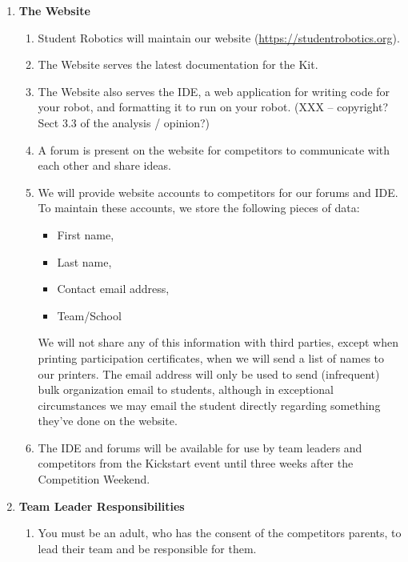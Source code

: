 \documentclass[a4paper, 11pt]{scrartcl}
\begin{document}
\begin{enumerate}
\begin{enumerate}
\begin{enumerate}
\end{enumerate}
\end{enumerate}

\item \textbf{The Website}
\begin{enumerate}

\item Student Robotics will maintain our website (\url{https://studentrobotics.org}).

\item The Website serves the latest documentation for the Kit.

\item The Website also serves the IDE, a web application for writing code for
your robot, and formatting it to run on your robot. (XXX -- copyright?
Sect 3.3 of the analysis / opinion?)

\item A forum is present on the website for competitors to communicate with
each other and share ideas.

\item We will provide website accounts to competitors for our forums and IDE. To
maintain these accounts, we store the following pieces of data:

\begin{itemize}
\item First name,
\item Last name,
\item Contact email address,
\item Team/School
\end{itemize}
We will not share any of this information with third parties, except when
printing participation certificates, when we will send a list of names to
our printers. The email address will only be used to send (infrequent) bulk
organization email to students, although in exceptional circumstances we
may email the student directly regarding something they've done on the
website.

\item The IDE and forums will be available for use by team leaders and competitors
from the Kickstart event until three weeks after the Competition Weekend.

\end{enumerate}

\item \textbf{Team Leader Responsibilities}
\begin{enumerate}

\item You must be an adult, who has the consent of the competitors parents, to
lead their team and be responsible for them.


\end{enumerate}
\end{enumerate}
\end{document}
